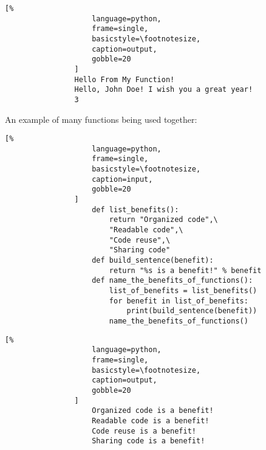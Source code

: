 \documentclass[crop=false,class=book]{standalone}
\begin{document}
            \begin{minipage}[t]{.48\textwidth}
                \centering
                \begin{lstlisting}[%
                    language=python,
                    frame=single,
                    basicstyle=\footnotesize,
                    caption=output,
                    gobble=20
                ]
                Hello From My Function!
                Hello, John Doe! I wish you a great year!
                3
                \end{lstlisting}
            \end{minipage}
            \newpage
            An example of many functions being used together:
            \newline
            \begin{minipage}[t]{.48\textwidth}
                \centering
                \begin{lstlisting}[%
                    language=python,
                    frame=single,
                    basicstyle=\footnotesize,
                    caption=input,
                    gobble=20
                ]
                    def list_benefits():
                        return "Organized code",\
                        "Readable code",\ 
                        "Code reuse",\
                        "Sharing code"
                    def build_sentence(benefit):
                        return "%s is a benefit!" % benefit
                    def name_the_benefits_of_functions():
                        list_of_benefits = list_benefits()
                        for benefit in list_of_benefits:
                            print(build_sentence(benefit))
                        name_the_benefits_of_functions()
                \end{lstlisting}
            \end{minipage}\hfill
            \begin{minipage}[t]{.48\textwidth}
                \centering
                \begin{lstlisting}[%
                    language=python,
                    frame=single,
                    basicstyle=\footnotesize,
                    caption=output,
                    gobble=20
                ]
                    Organized code is a benefit!
                    Readable code is a benefit!
                    Code reuse is a benefit!
                    Sharing code is a benefit!
                \end{lstlisting}
            \end{minipage}
\end{document}
